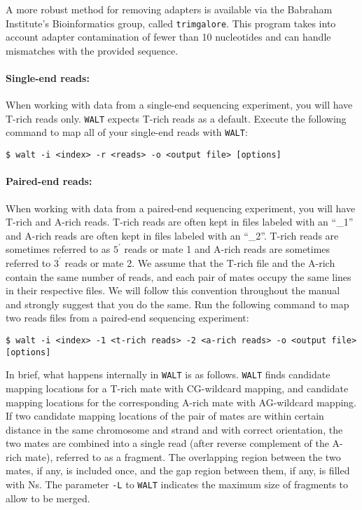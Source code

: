 \documentclass[10pt]{article}
\newcommand{\prog}[1]{\texttt{#1}}
\newcommand{\op}[1]{\texttt{#1}}
\begin{document}
A more robust method for removing adapters is available via the Babraham
Institute's Bioinformatics group, called \prog{trimgalore}. This program
takes into account adapter contamination of fewer than 10 nucleotides and
can handle mismatches with the provided sequence.

\paragraph{Single-end reads:}

When working with data from a single-end sequencing experiment, you
will have T-rich reads only. \prog{WALT} expects T-rich reads as a
default. Execute the following command to map all of your
single-end reads with \prog{WALT}:

\begin{verbatim}
$ walt -i <index> -r <reads> -o <output file> [options]
\end{verbatim}

\paragraph{Paired-end reads:}

When working with data from a paired-end sequencing experiment, you
will have T-rich and A-rich reads. T-rich reads are often kept in
files labeled with an ``\_1'' and A-rich reads are often kept in files
labeled with an ``\_2''.  T-rich reads are sometimes referred to as
$5^{\prime}$ reads or mate 1 and A-rich reads are sometimes referred
to $3^{\prime}$ reads or mate 2. We assume that the T-rich file and
the A-rich contain the same number of reads, and each pair of mates
occupy the same lines in their respective files. We will follow this
convention throughout the manual and strongly suggest that you do the
same. Run the following command to map two
reads files from a paired-end sequencing experiment:

\begin{verbatim}
$ walt -i <index> -1 <t-rich reads> -2 <a-rich reads> -o <output file> [options]
\end{verbatim}

In brief, what happens internally in \prog{WALT} is as follows.
\prog{WALT} finds candidate mapping locations for a T-rich mate
with CG-wildcard mapping, and candidate mapping locations for the
corresponding A-rich mate with AG-wildcard mapping. If two candidate
mapping locations of the pair of mates are within certain distance in
the same chromosome and strand and with correct orientation, the two
mates are combined into a single read (after reverse complement of the
A-rich mate), referred to as a fragment. The overlapping region
between the two mates, if any, is included once, and the gap region
between them, if any, is filled with Ns. The parameter \op{-L} to
\prog{WALT} indicates the maximum size of fragments to allow to
be merged.
\end{document}
